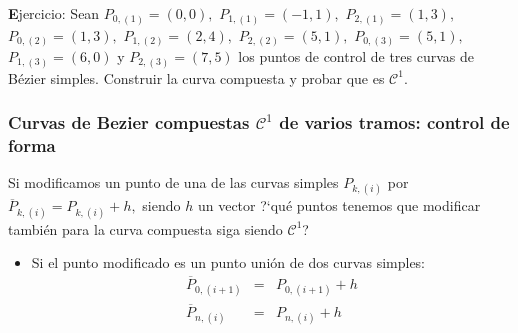 \documentclass[ebook,oneside]{memoir}
\begin{document}
{\textbf Ejercicio:}
Sean $P_{0,(1)}=(0,0),$ $P_{1,(1)}=(-1,1),$ $P_{2,(1)}=(1,3),$ $P_{0,(2)}=(1,3),$ $P_{1,(2)}=(2,4),$ $P_{2,(2)}=(5,1),$ $P_{0,(3)}=(5,1),$ $P_{1,(3)}=(6,0)$ y $P_{2,(3)}=(7,5)$ los puntos de control de tres curvas de B\'{e}zier simples. Construir la curva compuesta y probar que es ${\mathcal  C}^1$.

\subsubsection{Curvas de Bezier compuestas ${\mathcal  C}^1$ de varios tramos: control de forma}

Si modificamos un punto de una de las curvas simples $P_{k, (i)}$ por $\overline{P}_{k, (i)}=P_{k, (i)}+h,$ siendo $h$ un vector ?`qu\'{e} puntos tenemos que modificar tambi\'{e}n para la curva compuesta siga siendo ${\mathcal  C}^1$?

\begin{itemize}
\item Si el punto modificado es un punto uni\'{o}n de dos curvas simples:
$$\begin{array}{rcl} \overline{P}_{0, (i+1)}&=&P_{0, (i+1)}+h\\ \overline{P}_{n, (i)}&=&P_{n, (i)}+h\\ \end{array}$$
\end{itemize}
\end{document}
